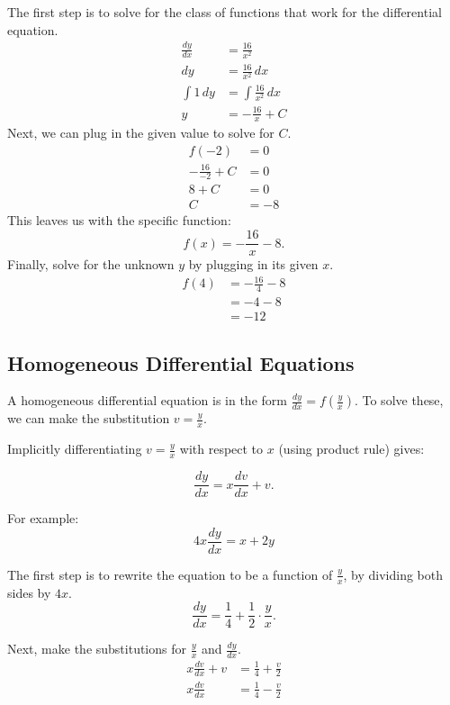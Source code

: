 \documentclass[12pt]{article}
\begin{document}
The first step is to solve for the class of functions that work for the differential equation.
\begin{align*}
    \frac{dy}{dx} & = \frac{16}{x^2}            \\[6pt]
    dy            & = \frac{16}{x^2} \, dx      \\[6pt]
    \int 1 \, dy  & = \int \frac{16}{x^2} \, dx \\[6pt]
    y             & = -\frac{16}{x} + C
\end{align*}
Next, we can plug in the given value to solve for $C$.
\begin{align*}
    f(-2)              & = 0  \\
    -\frac{16}{-2} + C & = 0  \\[6pt]
    8 + C              & = 0  \\
    C                  & = -8
\end{align*}
This leaves us with the specific function:
\[ f(x) = -\frac{16}{x} - 8. \]
Finally, solve for the unknown $y$ by plugging in its given $x$.
\begin{align*}
    f(4) & = -\frac{16}{4} - 8 \\[6pt]
         & = -4 - 8            \\
         & = -12
\end{align*}

\subsection{Homogeneous Differential Equations}
A homogeneous differential equation is in the form $\frac{dy}{dx} = f \left( \frac{y}{x} \right)$. To solve these, we can make the substitution $v = \frac{y}{x}$.

Implicitly differentiating $v = \frac{y}{x}$ with respect to $x$ (using product rule) gives:

\[ \frac{dy}{dx} = x \frac{dv}{dx} + v .\]

For example:
\[ 4x \frac{dy}{dx} = x + 2y \]

The first step is to rewrite the equation to be a function of $\frac{y}{x}$, by dividing both sides by $4x$.
\[ \frac{dy}{dx} = \frac{1}{4} + \frac{1}{2} \cdot \frac{y}{x}. \]

Next, make the substitutions for $\frac{y}{x}$ and $\frac{dy}{dx}$.
\begin{align*}
    x \frac{dv}{dx} + v & = \frac{1}{4} + \frac{v}{2} \\[6pt]
    x \frac{dv}{dx}     & = \frac{1}{4} - \frac{v}{2}
\end{align*}
\end{document}
